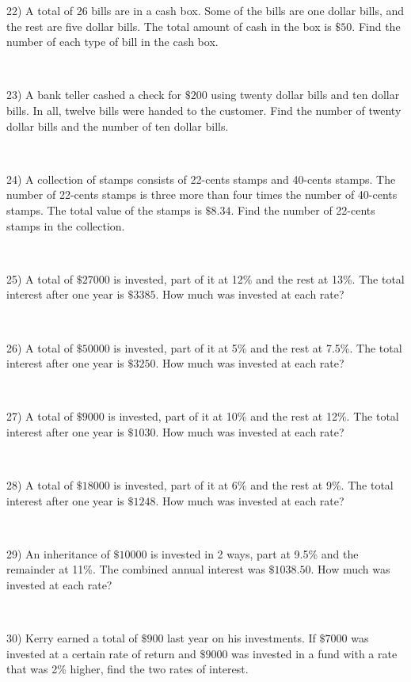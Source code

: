 22) A total of 26 bills are in a cash box. Some of the bills are one dollar
bills, and the rest are five dollar bills. The total amount of cash
in the box is $\$50$. Find  the number of each type of
bill in the cash box.\par
~\par

23) A bank teller cashed a check for $\$200$ using twenty dollar
bills and ten dollar  bills. In all, twelve bills were handed to
the customer. Find the number of twenty dollar bills and
the number of ten dollar bills.\par
~\par

24) A collection of stamps consists of 22-cents stamps and
40-cents stamps. The number of 22-cents stamps is
three more than four times the number of 40-cents stamps. The total value of the stamps is $\$8.34$. Find the number of
22-cents stamps in the collection.\par
~\par

25) A total of $\$27000$ is invested, part of it at 12\% and the rest
at 13\%. The total interest after one year is
$\$3385$. How much was invested at each rate?\par
~\par

26) A total of $\$50000$ is invested, part of it at 5\% and the rest
at 7.5\%. The total interest after one year is $\$3250$.
How much was invested at each rate?\par
~\par

27) A total of $\$9000$ is invested, part of it at 10\% and the rest
at 12\%. The total interest after one year is $\$1030$.
How much was invested at each rate?\par
~\par

28) A total of $\$18000$ is invested, part of it at 6\% and the rest
at 9\%. The total interest after one year is
$\$1248$. How much was invested at each rate?\par
~\par

29) An inheritance of $\$10000$ is invested in 2 ways, part at 9.5\%
and the remainder at 11\%. The combined
annual interest was $\$1038.50$. How much was
invested at each rate?\par
~\par

30) Kerry earned a total of $\$900$ last year on his investments. If
$\$7000$ was invested at a certain rate
of return and $\$9000$ was invested in a fund with a rate that was 2\% higher, find the two rates of interest.\par
~\par

